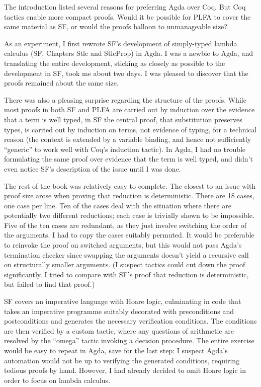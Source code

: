 \documentclass[runningheads]{llncs}
\begin{document}

The introduction listed several reasons for preferring Agda over Coq.
But Coq tactics enable more compact proofs. Would it be possible for
PLFA to cover the same material as SF, or would the proofs
balloon to unmanageable size?

As an experiment, I first rewrote SF's development of simply-typed
lambda calculus (SF, Chapters Stlc and StlcProp) in Agda.  I was a
newbie to Agda, and translating the entire development, sticking as
closely as possible to the development in SF, took me about two days.
I was pleased to discover that the proofs remained about the same
size.

There was also a pleasing surprise regarding the structure of the
proofs. While most proofs in both SF and PLFA are carried out by
induction over the evidence that a term is well typed, in SF the
central proof, that substitution preserves types, is carried out by
induction on terms, not evidence of typing, for a technical reason
(the context is extended by a variable binding, and hence not
sufficiently ``generic'' to work well with Coq's induction tactic). In
Agda, I had no trouble formulating the same proof over evidence that
the term is well typed, and didn't even notice SF's description of the
issue until I was done.

The rest of the book was relatively easy to complete.  The closest to
an issue with proof size arose when proving that reduction is
deterministic.  There are 18 cases, one case per line.  Ten of the
cases deal with the situation where there are potentially two
different reductions; each case is trivially shown to be
impossible.  Five of the ten cases are redundant, as they just involve
switching the order of the arguments.  I had to copy the cases
suitably permuted. It would be preferable to reinvoke the proof on
switched arguments, but this would not pass Agda's termination checker
since swapping the arguments doesn't yield a recursive call on
structurally smaller arguments.  (I suspect tactics could cut down the
proof significantly. I tried to compare with SF's proof that reduction
is deterministic, but failed to find that proof.)

SF covers an imperative language with Hoare logic, culminating in
code that takes an imperative programme suitably decorated with preconditions
and postconditions and generates the necessary
verification conditions. The conditions are then verified by a custom
tactic, where any questions of arithmetic are resolved by the
``omega'' tactic invoking a decision procedure.  The entire
exercise would be easy to repeat in Agda, save for the last step: I
suspect Agda's automation would not be up to verifying the generated
conditions, requiring tedious proofs by hand.  However, I had already
decided to omit Hoare logic in order to focus on lambda calculus.
\end{document}
